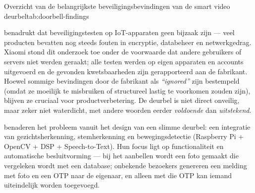 \documentclass[nonacm, sigconf, balance=true]{acmart}
\begin{document}
    \begin{SimpleTable}[s{0.5}s{1.5}]{Overzicht van de belangrijkste beveiligingsbevindingen van de smart video deurbel}{tab:doorbell-findings}
    \end{SimpleTable}

    \citeauthor{liu2021ethical} benadrukt dat beveiligingstesten op IoT-apparaten geen bijzaak zijn — veel producten bevatten nog steeds fouten in encryptie, databeheer en netwerkgedrag.
    Xiaomi stond dit onderzoek toe onder de voorwaarde dat andere gebruikers of servers niet werden geraakt; alle testen werden op eigen apparaten en accounts uitgevoerd en de gevonden kwetsbaarheden zijn gerapporteerd aan de fabrikant.
    Hoewel sommige bevindingen door de fabrikant als \textit{``ignored''} zijn bestempeld (omdat ze moeilijk te misbruiken of structureel lastig te voorkomen zouden zijn), blijven ze cruciaal voor productverbetering.
    De deurbel is niet direct onveilig, maar zeker niet waterdicht, met andere woorden eerder \emph{voldoende} dan \emph{uitstekend}.

    \parencite{chaudhari2020smart} benaderen het probleem vanuit het design van een slimme deurbel: een integratie van gezichtsherkenning, stemherkenning en bewegingsdetectie (Raspberry Pi + OpenCV + DSP + Speech-to-Text).
    Hun focus ligt op functionaliteit en automatische besluitvorming — bij het aanbellen wordt een foto gemaakt die vergeleken wordt met een database; onbekende bezoekers genereren een melding met foto en een OTP naar de eigenaar, en alleen met die OTP kan iemand uiteindelijk worden toegevoegd.
\end{document}
